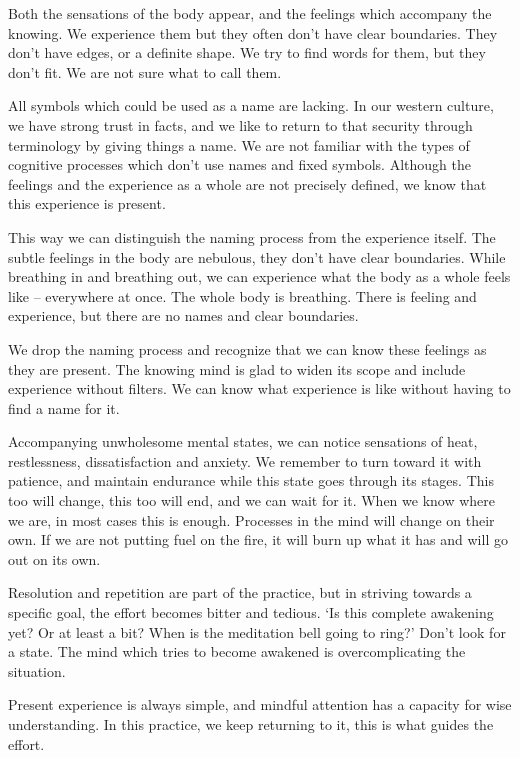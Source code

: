 Both the sensations of the body appear, and the feelings which accompany
the knowing. We experience them but they often don't have clear
boundaries. They don't have edges, or a definite shape. We try to find
words for them, but they don't fit. We are not sure what to call them.

All symbols which could be used as a name are lacking. In our western
culture, we have strong trust in facts, and we like to return to that
security through terminology by giving things a name. We are not
familiar with the types of cognitive processes which don't use names and
fixed symbols. Although the feelings and the experience as a whole are
not precisely defined, we know that this experience is present.

This way we can distinguish the naming process from the experience
itself. The subtle feelings in the body are nebulous, they don't have
clear boundaries. While breathing in and breathing out, we can
experience what the body as a whole feels like -- everywhere at once.
The whole body is breathing. There is feeling and experience, but there
are no names and clear boundaries.

We drop the naming process and recognize that we can know these feelings
as they are present. The knowing mind is glad to widen its scope and
include experience without filters. We can know what experience is like
without having to find a name for it.


Accompanying unwholesome mental states, we can notice sensations of
heat, restlessness, dissatisfaction and anxiety. We remember to turn
toward it with patience, and maintain endurance while this state goes
through its stages. This too will change, this too will end, and we can
wait for it. When we know where we are, in most cases this is enough.
Processes in the mind will change on their own. If we are not putting
fuel on the fire, it will burn up what it has and will go out on its
own.

Resolution and repetition are part of the practice, but in striving
towards a specific goal, the effort becomes bitter and tedious. `Is this
complete awakening yet? Or at least a bit? When is the meditation bell
going to ring?' Don't look for a state. The mind which tries to become
awakened is overcomplicating the situation.

Present experience is always simple, and mindful attention has a
capacity for wise understanding. In this practice, we keep returning to
it, this is what guides the effort.

